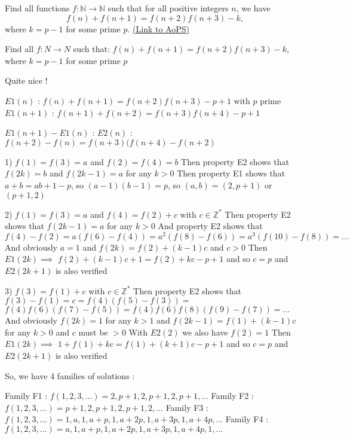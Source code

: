 \begin{problem}
	Find all functions $f: \mathbb N\to \mathbb N$ such that for all positive integers $n$, we have
\[f(n)+f(n+1)=f(n+2)f(n+3)-k,\]
where $k=p-1$ for some prime $p$.
	\flushright \href{https://artofproblemsolving.com/community/c6h153287}{(Link to AoPS)}
\end{problem}



\begin{mysolution}
	\begin{tcolorbox}Find all $f: N\to N$ such that:
$f(n)+f(n+1)=f(n+2)f(n+3)-k$, where $k=p-1$ for some prime $p$\end{tcolorbox}
Quite nice !


$E1(n)$ : $f(n)+f(n+1)=f(n+2)f(n+3)-p+1$  with $p$ prime
$E1(n+1)$ : $f(n+1)+f(n+2)=f(n+3)f(n+4)-p+1$

$E1(n+1)-E1(n)$ : $E2(n)$ : $f(n+2)-f(n)=f(n+3)(f(n+4)-f(n+2)$

1) $f(1)=f(3)=a$ and $f(2)=f(4)=b$
Then property E2 shows that $f(2k)=b$ and $f(2k-1)=a$ for any $k>0$
Then property E1 shows that $a+b=ab+1-p$, so $(a-1)(b-1)=p$, so $(a,b)=(2,p+1)$ or $(p+1,2)$

2) $f(1)=f(3)=a$ and $f(4)=f(2)+c$ with $c\in \mathbb{Z}^{*}$
Then property E2 shows that $f(2k-1)=a$ for any $k>0$
And property E2 shows that $f(4)-f(2)=a(f(6)-f(4))=a^{2}(f(8)-f(6))=a^{3}(f(10)-f(8))=...$
And obviously $a=1$ and $f(2k)=f(2)+(k-1)c$ and $c>0$
Then $E1(2k)\implies$ $f(2)+(k-1)c+1=f(2)+kc-p+1$ and so $c=p$ and $E2(2k+1)$ is also verified

3) $f(3)=f(1)+c$ with $c\in \mathbb{Z}^{*}$
Then property E2 shows that $f(3)-f(1)=c=f(4)(f(5)-f(3))=$ $f(4)f(6)(f(7)-f(5))=f(4)f(6)f(8)(f(9)-f(7))=...$
And obviously $f(2k)=1$ for any $k>1$ and $f(2k-1)=f(1)+(k-1)c$ for any $k>0$ and $c$ must be $>0$
With $E2(2)$ we also have $f(2)=1$
Then $E1(2k)\implies$ $1+f(1)+kc= f(1)+(k+1)c-p+1$ and so $c=p$ and $E2(2k+1)$ is also verified

So, we have 4 families of solutions :

Family F1 : $f(1,2,3,...)=2,p+1,2,p+1,2,p+1, ...$
Family F2 : $f(1,2,3,...)=p+1,2,p+1,2,p+1,2, ...$
Family F3 : $f(1,2,3,...)=1,a,1,a+p,1,a+2p,1,a+3p,1,a+4p, ...$
Family F4 : $f(1,2,3,...)=a,1,a+p,1,a+2p,1,a+3p,1,a+4p,1, ...$
\end{mysolution}



